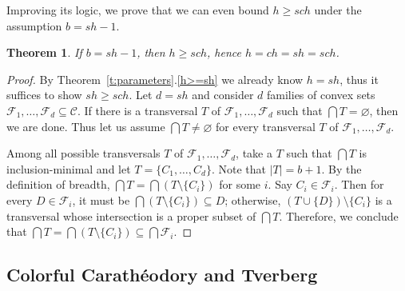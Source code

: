 \documentclass[11pt]{article}
\newtheorem{thm}{Theorem}[section]%
\theoremstyle{definition}
\newcommand{\F}{\mathcal{F}}
\newcommand{\C}{\mathcal{C}}
\newcommand{\size}[1]{\left| #1 \right|}
\begin{document}
Improving its logic, we prove that we can even bound $h \geq sch$ under the assumption $b = sh-1$.
\begin{thm}
    If $b = sh-1$, then $h \geq sch$, hence $h = ch = sh = sch$.
\end{thm}
\begin{proof}
    By Theorem~\ref{t:parameters}.\ref{h>=sh} we already know $h = sh$, thus it suffices to show $sh \geq sch$.
    Let $d = sh$ and consider $d$ families of convex sets $\F_1, \ldots, \F_d \subseteq \C$.
    If there is a transversal $T$ of $\F_1, \ldots, \F_d$ such that $\bigcap T = \varnothing$, then we are done.
    Thus let us assume $\bigcap T \neq \varnothing$ for every transversal $T$ of $\F_1, \ldots, \F_d$.




    Among all possible transversals $T$ of $\F_1, \ldots, \F_d$, take a $T$ such that $\bigcap T$ is inclusion-minimal and let $T = \{C_1, \ldots, C_d\}$.
    Note that $\size{T} = b+1$.
    By the definition of breadth, $\bigcap T = \bigcap(T \setminus \{C_i\})$ for some $i$.
    Say $C_i \in \F_i$.
    Then for every $D \in \F_i$, it must be $\bigcap(T \setminus \{C_i\}) \subseteq D$; otherwise, $(T \cup \{D\}) \setminus \{C_i\}$ is a transversal whose intersection is a proper subset of $\bigcap T$.
    Therefore, we conclude that $\bigcap T = \bigcap(T \setminus \{C_i\}) \subseteq \bigcap \F_i$.
\end{proof}





\subsection{Colorful Carath\'eodory and Tverberg}\label{subsec:strong:corollaries}
\end{document}
